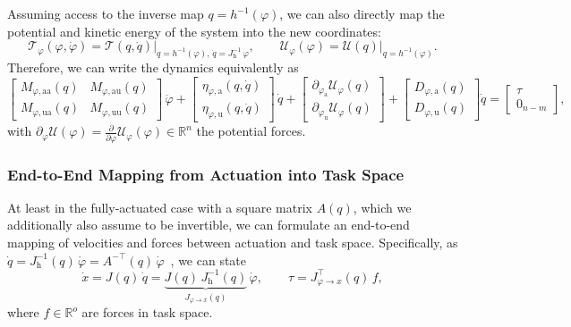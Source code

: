 Assuming access to the inverse map $q = h^{-1}(\varphi)$, we can also directly map the potential and kinetic energy of the system into the new coordinates:
\begin{equation}
    \mathcal{T}_\varphi(\varphi, \dot{\varphi}) = \mathcal{T}\left ( q, \dot{q} \right ) \big |_{q=h^{-1}(\varphi), \, \dot{q}=J_\mathrm{h}^{-1} \, \varphi},
    \qquad
    \mathcal{U}_\varphi(\varphi) = \mathcal{U}\left ( q \right ) \big |_{q=h^{-1}(\varphi)}.
\end{equation}
Therefore, we can write the dynamics equivalently as
\begin{equation}
    \begin{bmatrix}
        M_{\varphi,\mathrm{aa}}(q) & M_{\varphi,\mathrm{au}}(q)\\ 
        M_{\varphi,\mathrm{ua}}(q) & M_{\varphi,\mathrm{uu}}(q)
    \end{bmatrix} \, \ddot{\varphi} + \begin{bmatrix}
        \eta_{\varphi,\mathrm{a}}(q,\dot{q})\\ \eta_{\varphi,\mathrm{u}}(q,\dot{q})
    \end{bmatrix} \, \dot{q} + \begin{bmatrix}
        \partial_{\varphi_\mathrm{a}} \mathcal{U}_\varphi(q)\\
        \partial_{\varphi_\mathrm{u}} \mathcal{U}_\varphi(q)
    \end{bmatrix} + \begin{bmatrix}
        D_{\varphi,\mathrm{a}}(q)\\
        D_{\varphi,\mathrm{u}}(q)
    \end{bmatrix} \dot{q} = \begin{bmatrix}
        \tau\\ 0_{n-m}
    \end{bmatrix},
\end{equation}
with $\partial_\varphi \mathcal{U}(\varphi) = \frac{\partial }{\partial \varphi}  \mathcal{U}_\varphi(\varphi) \in \mathbb{R}^n$ the potential forces.

\subsubsection{End-to-End Mapping from Actuation into Task Space}
At least in the fully-actuated case with a square matrix $A(q)$, which we additionally also assume to be invertible, we can formulate an end-to-end mapping of velocities and forces between actuation and task space.
Specifically, as $\dot{q} = J_\mathrm{h}^{-1}(q) \, \dot{\varphi} = A^{-\top}(q) \, \dot{\varphi}$~\citep{pustina2024input}, we can state
\begin{equation}
    \dot{x} = J(q) \, \dot{q} = \underbrace{J(q) \, J_\mathrm{h}^{-1}(q) }_{J_{\varphi \to x}(q)} \, \dot{\varphi},
    \qquad
    \tau = J_{\varphi \to x}^\top(q) \, f,
\end{equation}
where $f \in \mathbb{R}^{o}$ are forces in task space. 